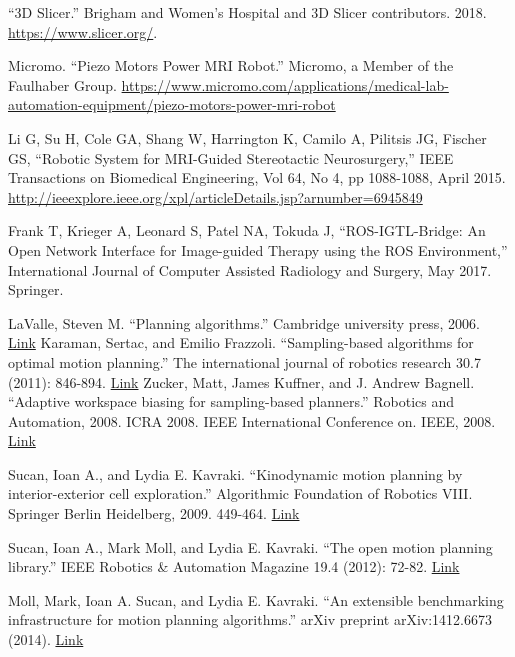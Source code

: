 \documentclass[12pt]{report}
\begin{document}
\begin{thebibliography}{99}
 ``3D Slicer.'' Brigham and Women's Hospital and 3D Slicer contributors. 2018. \url{https://www.slicer.org/}.

 Micromo. ``Piezo Motors Power MRI Robot.'' Micromo, a Member of the Faulhaber Group.  \url{https://www.micromo.com/applications/medical-lab-automation-equipment/piezo-motors-power-mri-robot}

 Li G, Su H, Cole GA, Shang W, Harrington K, Camilo A, Pilitsis JG, Fischer GS, ``Robotic System for MRI-Guided Stereotactic Neurosurgery,'' IEEE Transactions on Biomedical Engineering, Vol 64, No 4, pp 1088-1088, April 2015. \url{http://ieeexplore.ieee.org/xpl/articleDetails.jsp?arnumber=6945849}

 Frank T, Krieger A, Leonard S, Patel NA, Tokuda J, ``ROS-IGTL-Bridge: An Open Network Interface for Image-guided Therapy using the ROS Environment,'' International Journal of Computer Assisted Radiology and Surgery, May 2017. Springer.

 LaValle, Steven M. ``Planning algorithms.'' Cambridge university press, 2006. \href{http://citeseerx.ist.psu.edu/viewdoc/download?doi=10.1.1.225.1874&rep=rep1&type=pdf}{Link}
 Karaman, Sertac, and Emilio Frazzoli. ``Sampling-based algorithms for optimal motion planning.'' The international journal of robotics research 30.7 (2011): 846-894. \href{http://citeseerx.ist.psu.edu/viewdoc/download?doi=10.1.1.419.5503&rep=rep1&type=pdf}{Link}
 Zucker, Matt, James Kuffner, and J. Andrew Bagnell. ``Adaptive workspace biasing for sampling-based planners.'' Robotics and Automation, 2008. ICRA 2008. IEEE International Conference on. IEEE, 2008. \href{http://www.ri.cmu.edu/pub_files/pub4/zucker_matthew_2008_1/zucker_matthew_2008_1.pdf}{Link}

 Sucan, Ioan A., and Lydia E. Kavraki. ``Kinodynamic motion planning by interior-exterior cell exploration.'' Algorithmic Foundation of Robotics VIII. Springer Berlin Heidelberg, 2009. 449-464. \href{http://www.wafr.org/wafr2008/papers/wafr08-sucan.pdf}{Link}

 Sucan, Ioan A., Mark Moll, and Lydia E. Kavraki. ``The open motion planning library.'' IEEE Robotics \& Automation Magazine 19.4 (2012): 72-82. \href{http://ieeexplore.ieee.org/abstract/document/6377468/}{Link}

 Moll, Mark, Ioan A. Sucan, and Lydia E. Kavraki. ``An extensible benchmarking infrastructure for motion planning algorithms.'' arXiv preprint arXiv:1412.6673 (2014). \href{https://arxiv.org/pdf/1412.6673.pdf}{Link}


\end{thebibliography}
\end{document}
